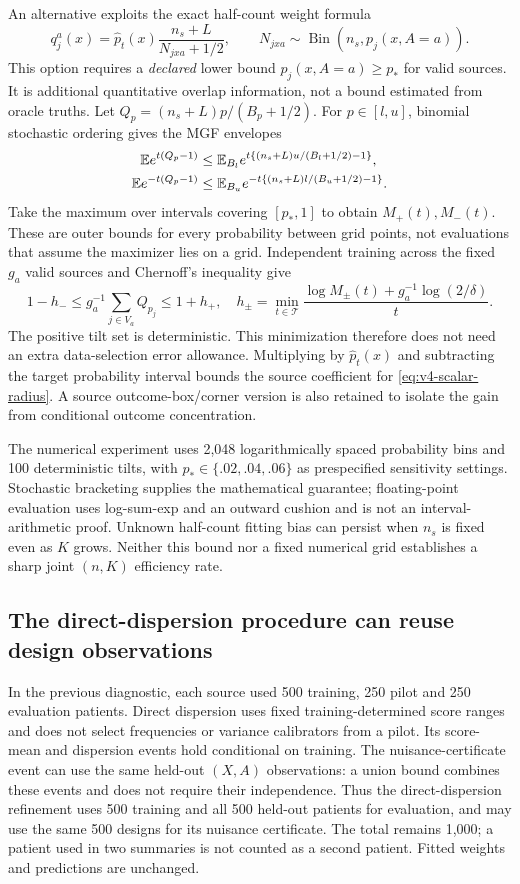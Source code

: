 An alternative exploits the exact half-count weight formula
\[
 q_j^a(x)=\hat p_t(x)\frac{n_s+L}{N_{jxa}+1/2},\qquad
 N_{jxa}\sim\operatorname{Bin}(n_s,p_j(x,A=a)).
\]
This option requires a \emph{declared} lower bound $p_j(x,A=a)\ge p_*$ for
valid sources. It is additional quantitative overlap information, not a bound
estimated from oracle truths. Let $Q_p=(n_s+L)p/(B_p+1/2)$.
For $p\in[l,u]$, binomial stochastic ordering gives the MGF envelopes
\begin{align*}
 \mathbb E e^{t(Q_p-1)}
 &\le\mathbb E_{B_l}e^{t\{(n_s+L)u/(B_l+1/2)-1\}},\\
 \mathbb E e^{-t(Q_p-1)}
 &\le\mathbb E_{B_u}e^{-t\{(n_s+L)l/(B_u+1/2)-1\}}.
\end{align*}
Take the maximum over intervals covering $[p_*,1]$ to obtain
$M_+(t),M_-(t)$. These are outer bounds for every probability between grid
points, not evaluations that assume the maximizer lies on a grid.
Independent training across the fixed $g_a$ valid sources and Chernoff's
inequality give
\[
 1-h_-\le g_a^{-1}\sum_{j\in V_a}Q_{p_j}\le1+h_+,
 \quad
 h_\pm=\min_{t\in\mathcal T}
 \frac{\log M_\pm(t)+g_a^{-1}\log(2/\delta)}{t}.
\]
The positive tilt set is deterministic. This minimization therefore does not
need an extra data-selection error allowance. Multiplying by $\hat p_t(x)$
and subtracting the target probability interval bounds the source coefficient
for \eqref{eq:v4-scalar-radius}. A source outcome-box/corner version is also
retained to isolate the gain from conditional outcome concentration.

The numerical experiment uses 2,048 logarithmically spaced probability bins
and 100 deterministic tilts, with $p_*\in\{.02,.04,.06\}$ as prespecified
sensitivity settings. Stochastic bracketing supplies the mathematical guarantee;
floating-point evaluation uses log-sum-exp and an outward cushion and is not
an interval-arithmetic proof. Unknown half-count fitting bias can persist when
$n_s$ is fixed even as $K$ grows. Neither this bound nor a fixed numerical grid
establishes a sharp joint $(n,K)$ efficiency rate.

\subsection{The direct-dispersion procedure can reuse design observations}

In the previous diagnostic, each source used 500 training, 250 pilot and 250
evaluation patients. Direct dispersion uses fixed training-determined score
ranges and does not select frequencies or variance calibrators from a pilot.
Its score-mean and dispersion events hold conditional on training.
The nuisance-certificate event can use the same held-out $(X,A)$ observations:
a union bound combines these events and does not require their independence.
Thus the direct-dispersion refinement uses 500 training and all 500 held-out
patients for evaluation, and may use the same 500 designs for its nuisance
certificate. The total remains 1,000; a patient used in two summaries is not
counted as a second patient. Fitted weights and predictions are unchanged.

